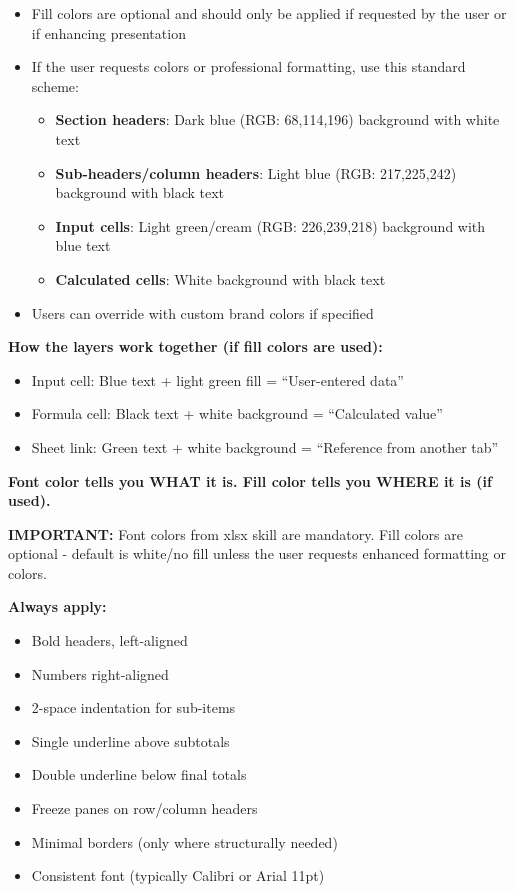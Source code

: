 \documentclass[11pt]{article}
\begin{document}
\begin{itemize}[leftmargin=*,itemsep=2pt,topsep=2pt]
\item {} Fill colors are optional and should only be applied if requested by the user or if enhancing presentation
\item {} If the user requests colors or professional formatting, use this standard scheme:
\begin{itemize}[leftmargin=*,itemsep=2pt,topsep=2pt]
\item {} \textbf{Section headers}: Dark blue (RGB: 68,114,196) background with white text
\item {} \textbf{Sub-headers/column headers}: Light blue (RGB: 217,225,242) background with black text
\item {} \textbf{Input cells}: Light green/cream (RGB: 226,239,218) background with blue text
\item {} \textbf{Calculated cells}: White background with black text
\end{itemize}
\item {} Users can override with custom brand colors if specified
\end{itemize}

\textbf{How the layers work together (if fill colors are used):}

\begin{itemize}[leftmargin=*,itemsep=2pt,topsep=2pt]
\item {} Input cell: Blue text + light green fill = ``User-entered data''
\item {} Formula cell: Black text + white background = ``Calculated value''
\item {} Sheet link: Green text + white background = ``Reference from another tab''
\end{itemize}

\textbf{Font color tells you WHAT it is. Fill color tells you WHERE it is (if used).}


\textbf{IMPORTANT:} Font colors from xlsx skill are mandatory. Fill colors are optional - default is white/no fill unless the user requests enhanced formatting or colors.


\textbf{Always apply:}

\begin{itemize}[leftmargin=*,itemsep=2pt,topsep=2pt]
\item {} Bold headers, left-aligned
\item {} Numbers right-aligned
\item {} 2-space indentation for sub-items
\item {} Single underline above subtotals
\item {} Double underline below final totals
\item {} Freeze panes on row/column headers
\item {} Minimal borders (only where structurally needed)
\item {} Consistent font (typically Calibri or Arial 11pt)
\end{itemize}
\end{document}
